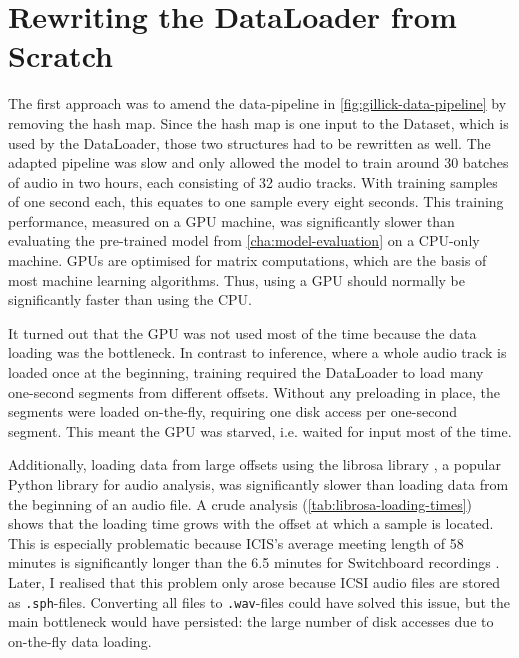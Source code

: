 \documentclass[bsc,frontabs,parskip,deptreport]{infthesis}
\begin{document}
\section{Rewriting the DataLoader from Scratch} \label{sec:first-data-pipeline}

The first approach was to amend the data-pipeline in \autoref{fig:gillick-data-pipeline} by removing the hash map. Since the hash map is one input to the Dataset, which is used by the DataLoader, those two structures had to be rewritten as well. 
The adapted pipeline was slow and only allowed the model to train around 30 batches of audio in two hours, each consisting of 32 audio tracks. 
With training samples of one second each, this equates to one sample every eight seconds.
This training performance, measured on a GPU machine, was significantly slower than evaluating the pre-trained model from \autoref{cha:model-evaluation} on a CPU-only machine. 
GPUs are optimised for matrix computations, which are the basis of most machine learning algorithms. Thus, using a GPU should normally be significantly faster than using the CPU.

It turned out that the GPU was not used most of the time because the data loading was the bottleneck. In contrast to inference, where a whole audio track is loaded once at the beginning, training required the DataLoader to load many one-second segments from different offsets. 
Without any preloading in place, the segments were loaded on-the-fly, requiring one disk access per one-second segment. This meant the GPU was starved, i.e. waited for input most of the time. 

Additionally, loading data from large offsets using the librosa library \citep{mcfee2015librosa}, a popular Python library for audio analysis, was significantly slower than loading data from the beginning of an audio file. A crude analysis (\autoref{tab:librosa-loading-times}) shows that the loading time grows with the offset at which a sample is located. 
This is especially problematic because ICIS's average meeting length of 58 minutes \citep{icsi-ldc} is significantly longer than the 6.5 minutes for Switchboard recordings \citep{switchboard-ldc}.
Later, I realised that this problem only arose because ICSI audio files are stored as \verb|.sph|-files. Converting all files to \verb|.wav|-files could have solved this issue, but the main bottleneck would have persisted: the large number of disk accesses due to on-the-fly data loading.
\end{document}
